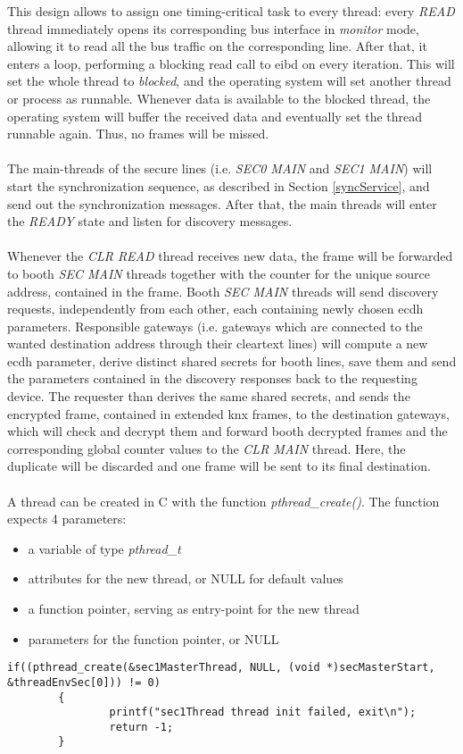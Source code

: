 This design allows to assign one timing-critical task to every thread: every \textit{READ} thread immediately opens its corresponding bus interface in \textit{monitor} mode, allowing it
to read all the bus traffic on the corresponding line. After that, it enters a loop, performing a blocking read call to \gls{eibd} on every iteration.
This will set the whole thread to \textit{blocked}, and the operating
system will set another thread or process as runnable. Whenever data is available to the blocked thread, the operating system will buffer the received data and eventually set the
thread runnable again. Thus, no frames will be missed.
\\
\\
The main-threads of the secure lines (i.e. \textit{SEC0 MAIN} and \textit{SEC1 MAIN}) will start the synchronization sequence, as described in Section \ref{syncService}, and send out
the synchronization messages. After  that, the main threads will enter the \textit{READY} state and listen for discovery messages.
\\
\\
Whenever the \textit{CLR READ} thread receives new data, the frame will be forwarded to booth \textit{SEC MAIN} threads together with the counter for the unique source address, contained
in the frame. Booth \textit{SEC MAIN} threads will send discovery requests, independently from each other, each containing newly chosen \gls{ecdh} parameters. Responsible gateways (i.e.
gateways which are connected to the wanted destination address through their cleartext lines) will compute a new \gls{ecdh} parameter, derive distinct shared secrets for booth lines,
save them and send the parameters contained in the discovery responses back to the requesting device. The requester than derives the same shared secrets, and sends the encrypted frame,
contained in extended \gls{knx} frames, to the destination gateways, which will check and decrypt them and forward booth decrypted frames and the corresponding global counter values
to the \textit{CLR MAIN} thread. Here, the duplicate will be discarded and one frame will be sent to its final destination.
\\
\\
A thread can be created in C with the function \textit{pthread\_create()}. The function expects 4 parameters:
\begin{itemize}
 \item a variable of type \textit{pthread\_t}
 \item attributes for the new thread, or NULL for default values
 \item a function pointer, serving as entry-point for the new thread
 \item parameters for the function pointer, or NULL
\end{itemize}
\begin{lstlisting}[style=BashInputStyle,caption={Thread-creation},label=lst:pthread_create]
if((pthread_create(&sec1MasterThread, NULL, (void *)secMasterStart, &threadEnvSec[0])) != 0)
        {
                printf("sec1Thread thread init failed, exit\n");
                return -1;
        }
\end{lstlisting}

